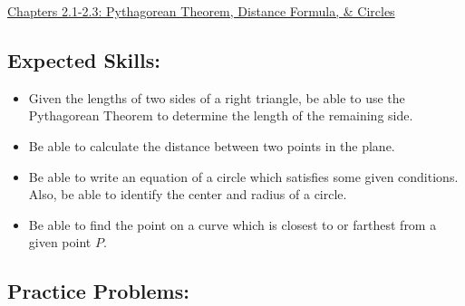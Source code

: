 \documentclass[12pt]{article}
\begin{document}
\begin{center}
\underline{\Large{Chapters 2.1-2.3: Pythagorean Theorem, Distance Formula, \& Circles}}
\end{center}

\subsection*{Expected Skills:}

\begin{itemize}

\item Given the lengths of two sides of a right triangle, be able to use the Pythagorean Theorem to determine the length of the remaining side.

\item Be able to calculate the distance between two points in the plane.

\item Be able to write an equation of a circle which satisfies some given conditions.  Also, be able to identify the center and radius of a circle.

\item Be able to find the point on a curve which is closest to or farthest from a given point $P$.

\end{itemize}

\subsection*{Practice Problems: }
\end{document}
